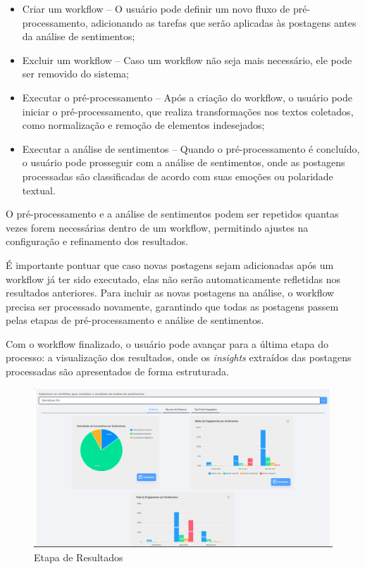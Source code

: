 \documentclass[
	12pt,				%
	oneside,			%
	a4paper,			%
	english,			%
	french,				%
	spanish,			%
	brazil				%
	]{abntex2}
\begin{document}
\begin{itemize}
\tightlist
\item
  Criar um workflow -- O usuário pode definir um novo fluxo de
  pré-processamento, adicionando as tarefas que serão aplicadas às
  postagens antes da análise de sentimentos;
\item
  Excluir um workflow -- Caso um workflow não seja mais necessário, ele
  pode ser removido do sistema;
\item
  Executar o pré-processamento -- Após a criação do workflow, o usuário
  pode iniciar o pré-processamento, que realiza transformações nos
  textos coletados, como normalização e remoção de elementos
  indesejados;
\item
  Executar a análise de sentimentos -- Quando o pré-processamento é
  concluído, o usuário pode prosseguir com a análise de sentimentos,
  onde as postagens processadas são classificadas de acordo com suas
  emoções ou polaridade textual.
\end{itemize}

O pré-processamento e a análise de sentimentos podem ser repetidos
quantas vezes forem necessárias dentro de um workflow, permitindo
ajustes na configuração e refinamento dos resultados.

É importante pontuar que caso novas postagens sejam adicionadas após um
workflow já ter sido executado, elas não serão automaticamente
refletidas nos resultados anteriores. Para incluir as novas postagens na
análise, o workflow precisa ser processado novamente, garantindo que
todas as postagens passem pelas etapas de pré-processamento e análise de
sentimentos.

Com o workflow finalizado, o usuário pode avançar para a última etapa do
processo: a visualização dos resultados, onde os \emph{insights}
extraídos das postagens processadas são apresentados de forma
estruturada.

\begin{figure}[htbp]
\hypertarget{etapa_resultados}{%
\caption{Etapa de Resultados}\label{etapa_resultados}
\begin{center}
\includegraphics[scale=0.2]{imagens/sentilytics/interface-grafica/resultado-graficos.png}
\end{center}
}
\end{figure}
\end{document}
